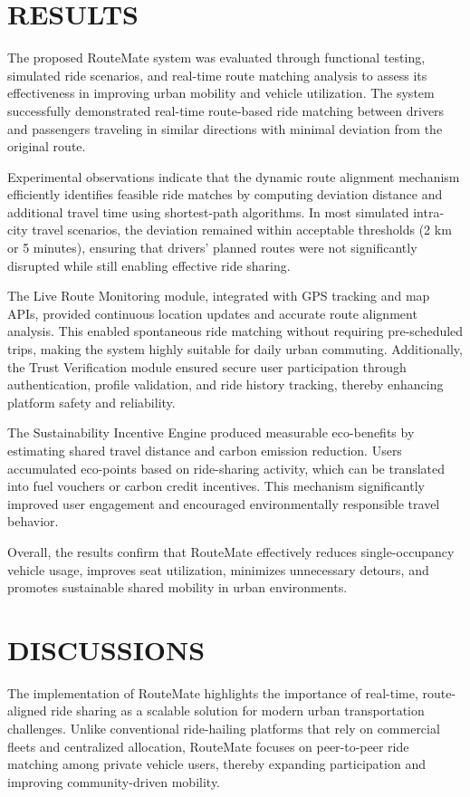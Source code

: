 \documentclass[conference]{IEEEtran}
\begin{document}
\section{RESULTS}

The proposed RouteMate system was evaluated through functional testing, simulated ride scenarios, and real-time route matching analysis to assess its effectiveness in improving urban mobility and vehicle utilization. The system successfully demonstrated real-time route-based ride matching between drivers and passengers traveling in similar directions with minimal deviation from the original route.

Experimental observations indicate that the dynamic route alignment mechanism efficiently identifies feasible ride matches by computing deviation distance and additional travel time using shortest-path algorithms. In most simulated intra-city travel scenarios, the deviation remained within acceptable thresholds (2 km or 5 minutes), ensuring that drivers’ planned routes were not significantly disrupted while still enabling effective ride sharing.

The Live Route Monitoring module, integrated with GPS tracking and map APIs, provided continuous location updates and accurate route alignment analysis. This enabled spontaneous ride matching without requiring pre-scheduled trips, making the system highly suitable for daily urban commuting. Additionally, the Trust Verification module ensured secure user participation through authentication, profile validation, and ride history tracking, thereby enhancing platform safety and reliability.

The Sustainability Incentive Engine produced measurable eco-benefits by estimating shared travel distance and carbon emission reduction. Users accumulated eco-points based on ride-sharing activity, which can be translated into fuel vouchers or carbon credit incentives. This mechanism significantly improved user engagement and encouraged environmentally responsible travel behavior.

Overall, the results confirm that RouteMate effectively reduces single-occupancy vehicle usage, improves seat utilization, minimizes unnecessary detours, and promotes sustainable shared mobility in urban environments.

\section{DISCUSSIONS}

The implementation of RouteMate highlights the importance of real-time, route-aligned ride sharing as a scalable solution for modern urban transportation challenges. Unlike conventional ride-hailing platforms that rely on commercial fleets and centralized allocation, RouteMate focuses on peer-to-peer ride matching among private vehicle users, thereby expanding participation and improving community-driven mobility.
\end{document}
